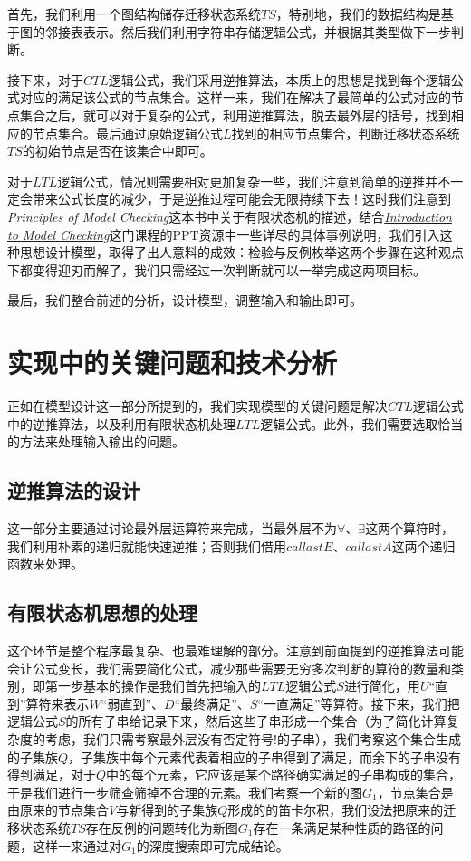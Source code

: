 \documentclass[UTF8]{ctexart}
\begin{document}
首先，我们利用一个图结构储存迁移状态系统$TS$，特别地，我们的数据结构是基于图的邻接表表示。然后我们利用字符串存储逻辑公式，并根据其类型做下一步判断。

接下来，对于$CTL$逻辑公式，我们采用逆推算法，本质上的思想是找到每个逻辑公式对应的满足该公式的节点集合。这样一来，我们在解决了最简单的公式对应的节点集合之后，就可以对于复杂的公式，利用逆推算法，脱去最外层的括号，找到相应的节点集合。最后通过原始逻辑公式$L$找到的相应节点集合，判断迁移状态系统$TS$的初始节点是否在该集合中即可。

对于$LTL$逻辑公式，情况则需要相对更加复杂一些，我们注意到简单的逆推并不一定会带来公式长度的减少，于是逆推过程可能会无限持续下去！这时我们注意到{\emph{Principles of Model Checking}}这本书中关于有限状态机的描述，结合\href{https://moves.rwth-aachen.de/teaching/ss-16/ss16introduction-to-model-checking/}{\emph{Introduction to Model Checking}}这门课程的PPT资源中一些详尽的具体事例说明，我们引入这种思想设计模型，取得了出人意料的成效：检验与反例枚举这两个步骤在这种观点下都变得迎刃而解了，我们只需经过一次判断就可以一举完成这两项目标。

最后，我们整合前述的分析，设计模型，调整输入和输出即可。

\section{实现中的关键问题和技术分析}
正如在模型设计这一部分所提到的，我们实现模型的关键问题是解决$CTL$逻辑公式中的逆推算法，以及利用有限状态机处理$LTL$逻辑公式。此外，我们需要选取恰当的方法来处理输入输出的问题。

\subsection{逆推算法的设计}
这一部分主要通过讨论最外层运算符来完成，当最外层不为${\forall}$、${\exists}$这两个算符时，我们利用朴素的递归就能快速逆推；否则我们借用$callastE$、$callastA$这两个递归函数来处理。

\subsection{有限状态机思想的处理}
这个环节是整个程序最复杂、也最难理解的部分。注意到前面提到的逆推算法可能会让公式变长，我们需要简化公式，减少那些需要无穷多次判断的算符的数量和类别，即第一步基本的操作是我们首先把输入的$LTL$逻辑公式$S$进行简化，用$U$“直到”算符来表示$W$“弱直到”、$D$“最终满足”、$S$“一直满足”等算符。接下来，我们把逻辑公式$S$的所有子串给记录下来，然后这些子串形成一个集合（为了简化计算复杂度的考虑，我们只需考察最外层没有否定符号$!$的子串），我们考察这个集合生成的子集族$Q$，子集族中每个元素代表着相应的子串得到了满足，而余下的子串没有得到满足，对于$Q$中的每个元素，它应该是某个路径确实满足的子串构成的集合，于是我们进行一步筛查筛掉不合理的元素。我们考察一个新的图$G_{1}$，节点集合是由原来的节点集合$V$与新得到的子集族$Q$形成的的笛卡尔积，我们设法把原来的迁移状态系统$TS$存在反例的问题转化为新图$G_{1}$存在一条满足某种性质的路径的问题，这样一来通过对$G_{1}$的深度搜索即可完成结论。
\end{document}
